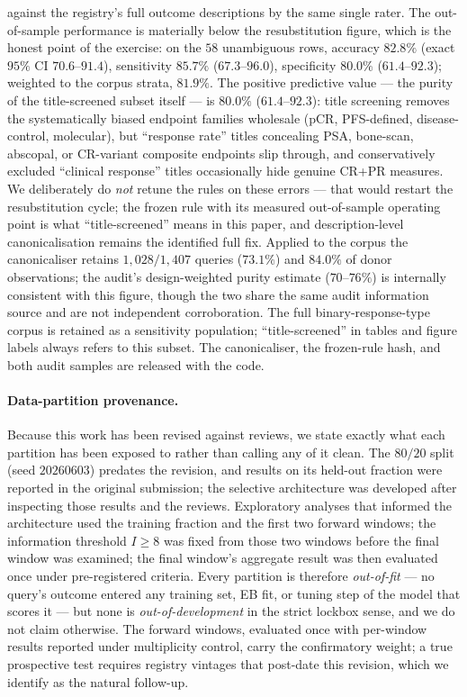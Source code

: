 \documentclass[11pt]{article}
\begin{document}
against the registry's full outcome descriptions by the same single rater.
The out-of-sample performance is materially below the resubstitution
figure, which is the honest point of the exercise: on the $58$ unambiguous
rows, accuracy $82.8\%$ (exact $95\%$ CI $70.6$--$91.4$), sensitivity
$85.7\%$ ($67.3$--$96.0$), specificity $80.0\%$ ($61.4$--$92.3$); weighted
to the corpus strata, $81.9\%$. The positive predictive value --- the
purity of the title-screened subset itself --- is $80.0\%$
($61.4$--$92.3$): title screening removes the systematically biased
endpoint families wholesale (pCR, PFS-defined, disease-control,
molecular), but ``response rate'' titles concealing PSA, bone-scan,
abscopal, or CR-variant composite endpoints slip through, and
conservatively excluded ``clinical response'' titles occasionally hide
genuine CR+PR measures. We deliberately do \emph{not} retune the rules on
these errors --- that would restart the resubstitution cycle; the frozen
rule with its measured out-of-sample operating point is what
``title-screened'' means in this paper, and description-level
canonicalisation remains the identified full fix.
Applied to the corpus the canonicaliser retains $1{,}028/1{,}407$ queries
($73.1\%$) and $84.0\%$ of donor observations; the audit's design-weighted
purity estimate ($70$--$76\%$) is internally consistent with this figure,
though the two share the same audit information source and are not
independent corroboration. The full binary-response-type corpus is retained
as a sensitivity population; ``title-screened'' in tables and figure labels
always refers to this subset. The canonicaliser, the frozen-rule hash, and
both audit samples are released with the code.

\paragraph{Data-partition provenance.} Because this work has been revised
against reviews, we state exactly what each partition has been exposed to
rather than calling any of it clean. The $80/20$ split (seed $20260603$)
predates the revision, and results on its held-out fraction were reported in
the original submission; the selective architecture was developed after
inspecting those results and the reviews. Exploratory analyses that informed
the architecture used the training fraction and the first two forward
windows; the information threshold $I \ge 8$ was fixed from those two windows
before the final window was examined; the final window's aggregate result was
then evaluated once under pre-registered criteria. Every partition is
therefore \emph{out-of-fit} --- no query's outcome entered any training set,
EB fit, or tuning step of the model that scores it --- but none is
\emph{out-of-development} in the strict lockbox sense, and we do not claim
otherwise. The forward windows, evaluated once with per-window results
reported under multiplicity control, carry the confirmatory weight; a true
prospective test requires registry vintages that post-date this revision,
which we identify as the natural follow-up.
\end{document}
